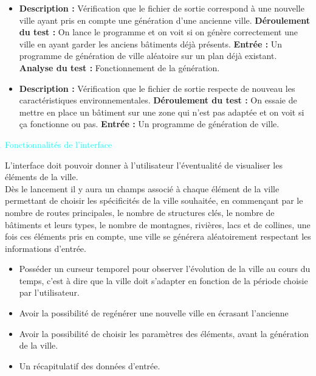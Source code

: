 {
\begin{itemize}

\item \textbf{\tab Description : } Vérification que le fichier de sortie correspond à une nouvelle ville ayant pris en compte une génération d'une ancienne ville.\newline
\textbf{\tab Déroulement du test : } On lance le programme et on voit si on génère correctement une ville en ayant garder les anciens bâtiments déjà présents. \newline
\textbf{\tab Entrée : } Un programme de génération de ville aléatoire sur un plan déjà existant. \newline
\textbf{\tab Analyse du test : } Fonctionnement de la génération.

\item \textbf{\tab Description : }Vérification que le fichier de sortie respecte de nouveau les caractéristiques environnementales. \newline
\textbf{\tab Déroulement du test : } On essaie de mettre en place un bâtiment sur une zone qui n'est pas adaptée et on voit si ça fonctionne ou pas.\newline
\textbf{\tab Entrée : } Un programme de génération de ville.

\end{itemize}
}
\besoin{}
{\textcolor{cyan}{Fonctionnalités de l'interface}}
{
L'interface doit pouvoir donner à l'utilisateur l'éventualité de visualiser les éléments de la ville.
\\Dès le lancement il y aura un champs associé à chaque élément de la ville permettant de choisir les spécificités de la ville souhaitée,
en commençant par le nombre de routes principales,  le nombre de structures clés, le nombre de bâtiments et leurs types,
le nombre de montagnes, rivières, lacs et de collines, une fois ces éléments pris en compte, une ville se générera aléatoirement respectant les informations d'entrée.

\begin{itemize}
    \item Posséder un curseur temporel pour observer l'évolution de la ville au cours du temps, c'est à dire que la ville doit s'adapter en fonction de la période choisie par l'utilisateur.
    \item Avoir la possibilité de regénérer une nouvelle ville en écrasant l'ancienne
    \item Avoir la possibilité de choisir les paramètres des éléments, avant la génération de la ville.
    \item Un récapitulatif des données d'entrée.

\end{itemize}
}
